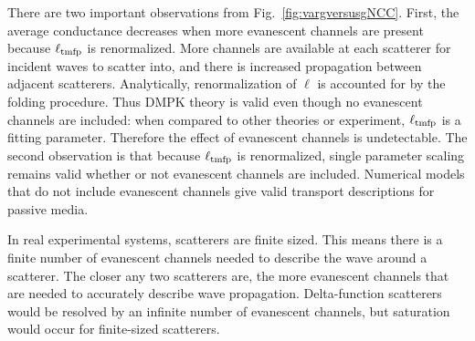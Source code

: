 There are two important observations from Fig.~\ref{fig:vargversusgNCC}. First, the average conductance decreases when more evanescent channels are present because $\ell_{\rm tmfp}$ is renormalized. More channels are available at each scatterer for incident waves to scatter into, and there is increased propagation between adjacent scatterers. Analytically, renormalization of $\ell$ is accounted for by the folding procedure. Thus DMPK theory is valid even though no evanescent channels are included: when compared to other theories or experiment, $\ell_{\rm tmfp}$ is a fitting parameter. Therefore the effect of evanescent channels is undetectable. The second observation is that because $\ell_{\rm tmfp}$ is renormalized, single parameter scaling remains valid whether or not evanescent channels are included. Numerical models that do not include evanescent channels give valid transport descriptions for passive media. 


In real experimental systems, scatterers are finite sized. This means there is a finite number of evanescent channels needed to describe the wave around a scatterer. The closer any two scatterers are, the more evanescent channels that are needed to accurately describe wave propagation. %
Delta-function scatterers would be resolved by an infinite number of evanescent channels, but saturation would occur for finite-sized scatterers.

